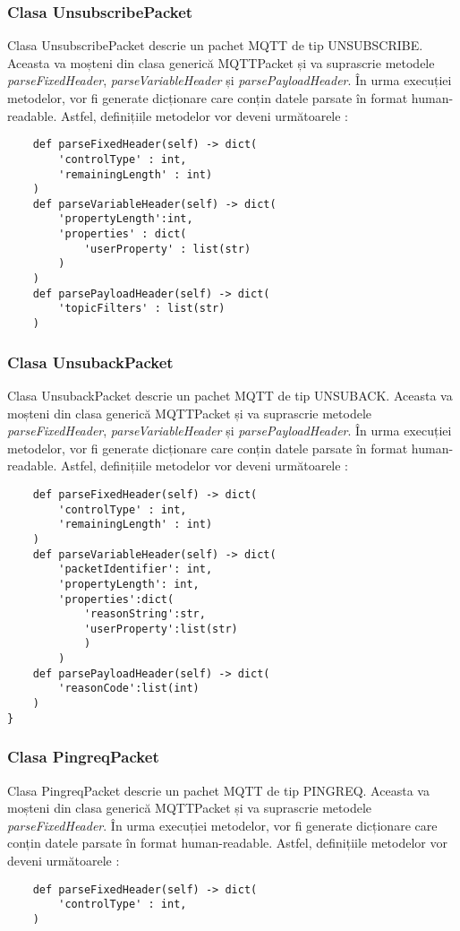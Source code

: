 \documentclass{report}
\begin{document}
\subsubsection{Clasa UnsubscribePacket}
Clasa UnsubscribePacket descrie un pachet MQTT de tip UNSUBSCRIBE. Aceasta va moșteni din clasa generică MQTTPacket și va suprascrie metodele \emph{parseFixedHeader}, \emph{parseVariableHeader} și \emph{parsePayloadHeader}.
În urma execuției metodelor, vor fi generate dicționare care conțin datele parsate în format human-readable.
Astfel, definițiile metodelor vor deveni următoarele : 
\\
\begin{verbatim}
	def parseFixedHeader(self) -> dict(
		'controlType' : int, 
		'remainingLength' : int)
	)
	def parseVariableHeader(self) -> dict(
		'propertyLength':int,
		'properties' : dict(
			'userProperty' : list(str)
		)
	)
	def parsePayloadHeader(self) -> dict(
		'topicFilters' : list(str)
	)
\end{verbatim}
\subsubsection{Clasa UnsubackPacket}
Clasa UnsubackPacket descrie un pachet MQTT de tip UNSUBACK. Aceasta va moșteni din clasa generică MQTTPacket și va suprascrie metodele \emph{parseFixedHeader}, \emph{parseVariableHeader} și \emph{parsePayloadHeader}.
În urma execuției metodelor, vor fi generate dicționare care conțin datele parsate în format human-readable.
Astfel, definițiile metodelor vor deveni următoarele : 
\\
\begin{verbatim}
	def parseFixedHeader(self) -> dict(
		'controlType' : int, 
		'remainingLength' : int)
	)
    def parseVariableHeader(self) -> dict(
    	'packetIdentifier': int,
    	'propertyLength': int,
    	'properties':dict(
    		'reasonString':str,
    		'userProperty':list(str)
    		)
    	)
	def parsePayloadHeader(self) -> dict(
		'reasonCode':list(int)
	)
}
\end{verbatim}
\subsubsection{Clasa PingreqPacket}
Clasa PingreqPacket descrie un pachet MQTT de tip PINGREQ. Aceasta va moșteni din clasa generică MQTTPacket și va suprascrie metodele \emph{parseFixedHeader}.
În urma execuției metodelor, vor fi generate dicționare care conțin datele parsate în format human-readable.
Astfel, definițiile metodelor vor deveni următoarele : 
\begin{verbatim}
	def parseFixedHeader(self) -> dict(
		'controlType' : int, 
	)
\end{verbatim}
\end{document}
